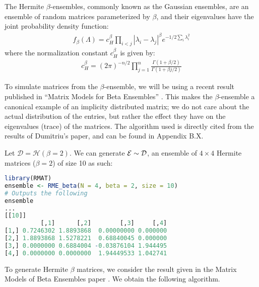 \begin{definition}
The Hermite $\beta$-ensembles, commonly known as the Gaussian ensembles, are an ensemble of random matrices parameterized by $\beta$, and their eigenvalues have the joint probability density function:
\begin{align*}
f_\beta(\Lambda) = c_H^\beta \prod_{i < j} |\lambda_i - \lambda_j|^\beta e^{-1/2\sum_i \lambda_i^2}
\end{align*}
where the normalization constant $c_H^\beta$ is given by:
\begin{align*}
c_H^\beta = (2\pi)^{-n/2} \prod_{j = 1}^n \frac{\Gamma(1 + \beta/2)}{\Gamma(1 + \beta j/2)}
\end{align*}
\end{definition}

To simulate matrices from the $\beta$-ensemble, we will be using a recent result published in ``Matrix Models for Beta Ensembles'' \cite{dumitriu}. This makes the $\beta$-ensemble a canonical example of an implicity distributed matrix; we do not care about the actual distribution of the entries, but rather the effect they have on the eigenvalues (trace) of the matrices. The algorithm used is directly cited from the results of Dumitriu's paper, and can be found in Appendix B.X.

\begin{code}[Hermite Beta = 2 Ensemble]
Let $\mathcal{D} = \mathcal{H}(\beta = 2)$. We can generate $\mathcal{E} \sim \mathcal{D}$, an ensemble of $4 \times 4$ Hermite matrices ($\beta = 2$) of size 10 as such:
\end{code}

\begin{lstlisting}[language=R]
library(RMAT)
ensemble <- RME_beta(N = 4, beta = 2, size = 10)
# Outputs the following
ensemble
...
[[10]]
          [,1]      [,2]        [,3]     [,4]
[1,] 0.7246302 1.8893868  0.00000000 0.000000
[2,] 1.8893868 1.5278221  0.68840045 0.000000
[3,] 0.0000000 0.6884004 -0.03876104 1.944495
[4,] 0.0000000 0.0000000  1.94449533 1.042741
\end{lstlisting}



To generate Hermite $\beta$ matrices, we consider the result given in the Matrix Models of Beta Ensembles paper \cite{dumitriu}. We obtain the following algorithm.

